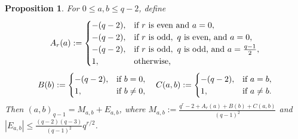 \documentclass[10pt,a4paper]{article}
\newtheorem{prop}[thm]{Proposition}
\numberwithin{equation}{section}
\begin{document}
\begin{prop}\label{prop:main-term-explicit-general}
For $0\le a,b\le q-2$, define
\[
  A_r(a):=
  \begin{cases}
    -(q-2), & \textup{if } r \textup{ is even and } a=0,\\
    -(q-2), & \textup{if } r \textup{ is odd},\ q \textup{ is even, and } a=0,\\
    -(q-2), & \textup{if } r \textup{ is odd},\ q \textup{ is odd, and } a=\frac{q-1}{2},\\
    1, & \textup{otherwise,}
  \end{cases}\]
  \[
  B(b):=
  \begin{cases}
    -(q-2), & \textup{if } b=0,\\
    1, & \textup{if } b\neq 0,
  \end{cases}\quad
  C(a,b):=
  \begin{cases}
    -(q-2), & \textup{if } a=b,\\
    1, & \textup{if } a\neq b.
  \end{cases}
\]
Then
$(a,b)_{q-1}=M_{a,b}+E_{a,b}$,
where
$M_{a,b}:=\frac{q^r-2+A_r(a)+B(b)+C(a,b)}{(q-1)^2}$
and
$|E_{a,b}|\le \frac{(q-2)(q-3)}{(q-1)^2}q^{r/2}$.
\end{prop}
\end{document}
